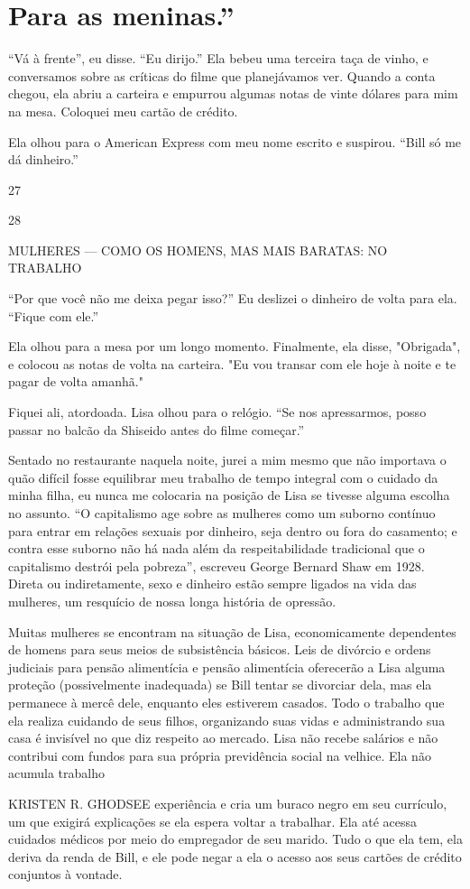 \section{Para as meninas.”}
 \par 
“Vá à frente”, eu disse. “Eu dirijo.” Ela bebeu uma terceira taça de vinho, e conversamos sobre as críticas do filme que planejávamos ver. Quando a conta chegou, ela abriu a carteira e empurrou algumas notas de vinte dólares para mim na mesa. Coloquei meu cartão de crédito.
 \par 
Ela olhou para o American Express com meu nome escrito e suspirou. “Bill só me dá dinheiro.”
 \par 
27
 \par 
28
 \par 
MULHERES — COMO OS HOMENS, MAS MAIS BARATAS: NO TRABALHO
 \par 
“Por que você não me deixa pegar isso?” Eu deslizei o dinheiro de volta para ela. “Fique com ele.”
 \par 
Ela olhou para a mesa por um longo momento. Finalmente, ela disse, "Obrigada", e colocou as notas de volta na carteira. "Eu vou transar com ele hoje à noite e te pagar de volta amanhã."
 \par 
Fiquei ali, atordoada. Lisa olhou para o relógio. “Se nos apressarmos, posso passar no balcão da Shiseido antes do filme começar.”
 \par 
Sentado no restaurante naquela noite, jurei a mim mesmo que não importava o quão difícil fosse equilibrar meu trabalho de tempo integral com o cuidado da minha filha, eu nunca me colocaria na posição de Lisa se tivesse alguma escolha no assunto. “O capitalismo age sobre as mulheres como um suborno contínuo para entrar em relações sexuais por dinheiro, seja dentro ou fora do casamento; e contra esse suborno não há nada além da respeitabilidade tradicional que o capitalismo destrói pela pobreza”, escreveu George Bernard Shaw em 1928. Direta ou indiretamente, sexo e dinheiro estão sempre ligados na vida das mulheres, um resquício de nossa longa história de opressão.
 \par 
Muitas mulheres se encontram na situação de Lisa, economicamente dependentes de homens para seus meios de subsistência básicos. Leis de divórcio e ordens judiciais para pensão alimentícia e pensão alimentícia oferecerão a Lisa alguma proteção (possivelmente inadequada) se Bill tentar se divorciar dela, mas ela permanece à mercê dele, enquanto eles estiverem casados. Todo o trabalho que ela realiza cuidando de seus filhos, organizando suas vidas e administrando sua casa é invisível no que diz respeito ao mercado. Lisa não recebe salários e não contribui com fundos para sua própria previdência social na velhice. Ela não acumula trabalho
 \par 
KRISTEN R. GHODSEE experiência e cria um buraco negro em seu currículo, um que exigirá explicações se ela espera voltar a trabalhar. Ela até acessa cuidados médicos por meio do empregador de seu marido. Tudo o que ela tem, ela deriva da renda de Bill, e ele pode negar a ela o acesso aos seus cartões de crédito conjuntos à vontade.
 \par 

